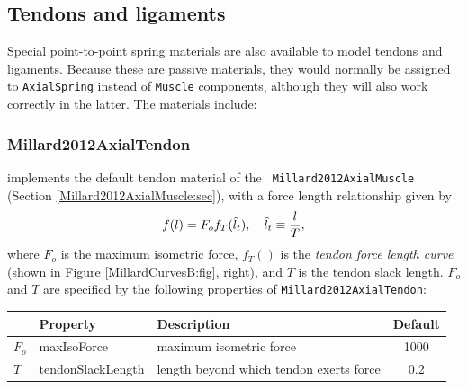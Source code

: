 


\subsection{Tendons and ligaments}
\label{TendonsAndLigaments:sec}

Special point-to-point spring materials are also available to model
tendons and ligaments. Because these are passive materials, they would
normally be assigned to {\tt AxialSpring} instead of {\tt Muscle}
components, although they will also work correctly in the latter.  The
materials include:

\subsubsection{Millard2012AxialTendon}

implements the default tendon material of the {\tt
Millard2012AxialMuscle} (Section \ref{Millard2012AxialMuscle:sec}),
with a force length relationship given by
%
\begin{equation}
f(l) = F_o f_T (\hat{l}_t), \quad \hat{l}_t \equiv \frac{l}{T},
\end{equation}
%
where $F_o$ is the maximum isometric force, $f_T()$ is the {\it tendon
force length curve} (shown in Figure \ref{MillardCurvesB:fig},
right), and $T$ is the tendon slack length. $F_o$ and $T$ are specified
by the following properties of {\tt Millard2012AxialTendon}:

\begin{center}
\begin{tabular}{|l|l|l|c|} 
\hline
& Property & Description & Default\\
\hline
$F_{o}$ & {\sf maxIsoForce} & 
maximum isometric force & 1000 \\
$T$ & {\sf tendonSlackLength} & 
length beyond which tendon exerts force & 0.2 \\
\hline
\end{tabular}
\end{center}

